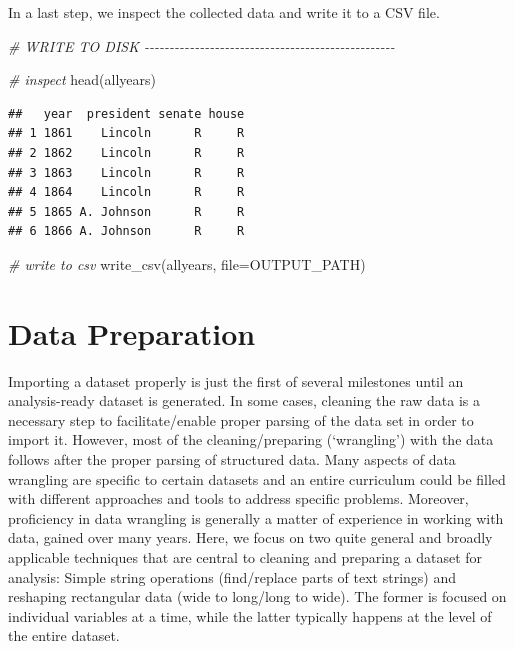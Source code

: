 \documentclass[
  12pt,
]{style/krantz}
\newenvironment{Shaded}{\begin{snugshade}}{\end{snugshade}}
\newcommand{\AttributeTok}[1]{\textcolor[rgb]{0.77,0.63,0.00}{#1}}
\newcommand{\CommentTok}[1]{\textcolor[rgb]{0.56,0.35,0.01}{\textit{#1}}}
\newcommand{\FunctionTok}[1]{\textcolor[rgb]{0.00,0.00,0.00}{#1}}
\newcommand{\NormalTok}[1]{#1}
\begin{document}
In a last step, we inspect the collected data and write it to a CSV file.

\begin{Shaded}
\begin{Highlighting}[]
\CommentTok{\# WRITE TO DISK {-}{-}{-}{-}{-}{-}{-}{-}{-}{-}{-}{-}{-}{-}{-}{-}{-}{-}{-}{-}{-}{-}{-}{-}{-}{-}{-}{-}{-}{-}{-}{-}{-}{-}{-}{-}{-}{-}{-}{-}{-}{-}{-}{-}{-}{-}{-}{-}{-}{-}}

\CommentTok{\# inspect}
\FunctionTok{head}\NormalTok{(allyears)}
\end{Highlighting}
\end{Shaded}

\begin{verbatim}
##   year  president senate house
## 1 1861    Lincoln      R     R
## 2 1862    Lincoln      R     R
## 3 1863    Lincoln      R     R
## 4 1864    Lincoln      R     R
## 5 1865 A. Johnson      R     R
## 6 1866 A. Johnson      R     R
\end{verbatim}

\begin{Shaded}
\begin{Highlighting}[]
\CommentTok{\# write to csv}
\FunctionTok{write\_csv}\NormalTok{(allyears, }\AttributeTok{file=}\NormalTok{OUTPUT\_PATH)}
\end{Highlighting}
\end{Shaded}

\hypertarget{data-preparation}{%
\chapter{Data Preparation}\label{data-preparation}}

Importing a dataset properly is just the first of several milestones until an analysis-ready dataset is generated. In some cases, cleaning the raw data is a necessary step to facilitate/enable proper parsing of the data set in order to import it. However, most of the cleaning/preparing (`wrangling') with the data follows after the proper parsing of structured data. Many aspects of data wrangling are specific to certain datasets and an entire curriculum could be filled with different approaches and tools to address specific problems. Moreover, proficiency in data wrangling is generally a matter of experience in working with data, gained over many years. Here, we focus on two quite general and broadly applicable techniques that are central to cleaning and preparing a dataset for analysis: Simple string operations (find/replace parts of text strings) and reshaping rectangular data (wide to long/long to wide). The former is focused on individual variables at a time, while the latter typically happens at the level of the entire dataset.
\end{document}

